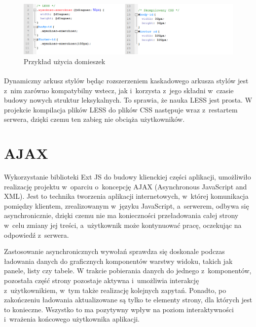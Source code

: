 \begin{figure}[h]
	\centering
	\includegraphics[width=1.00\textwidth]{images/less2.png}
	\caption{Przykład użycia domieszek}
\end{figure}
\paragraph{}

Dynamiczny arkusz stylów  będąc rozszerzeniem kaskadowego arkusza stylów jest z~nim zarówno kompatybilny wstecz, jak i~korzysta z~jego składni w~czasie budowy nowych struktur leksykalnych. To sprawia, że nauka LESS jest prosta.
W projekcie kompilacja plików LESS do plików CSS następuje wraz z~restartem serwera, dzięki czemu ten zabieg nie obciąża użytkowników. \cite{LESS}


\section{AJAX}
Wykorzystanie biblioteki Ext JS do budowy klienckiej części aplikacji, umożliwiło realizację projektu w~oparciu o~koncepcję AJAX (Asynchronous JavaScript and XML). Jest to technika tworzenia aplikacji internetowych, w~której komunikacja pomiędzy klientem, zrealizowanym w~języku JavaScript, a~serwerem, odbywa się asynchronicznie, dzięki czemu nie ma konieczności przeładowania całej strony w~celu zmiany jej treści, a~użytkownik może kontynuować pracę, oczekując na odpowiedź z~serwera.\cite{ajaxWoj}

Zastosowanie asynchronicznych wywołań sprawdza się doskonale podczas ładowania danych do graficznych komponentów warstwy widoku, takich jak panele, listy czy tabele. W trakcie pobierania danych do jednego z~komponentów, pozostała część strony pozostaje aktywna i~umożliwia interakcję z~użytkownikiem, w~tym także realizację kolejnych zapytań. Ponadto, po zakończeniu ładowania aktualizowane są tylko te elementy strony, dla których jest to konieczne. Wszystko to ma pozytywny wpływ na poziom interaktywności i~wrażenia końcowego użytkownika aplikacji.

